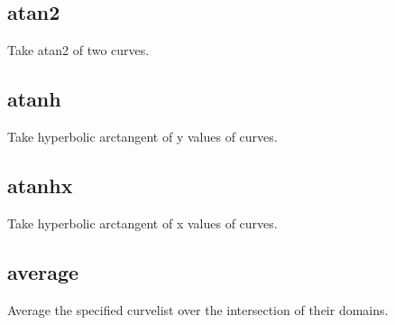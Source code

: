\documentclass[letterpaper,10pt,english]{sphinxmanual}
\begin{document}
\subsection{atan2}
\label{\detokenize{math_operations:atan2}}
Take atan2 of two curves.

\begin{sphinxVerbatim}[commandchars=\\\{\}]
\PYG{p}{[}\PYG{p}{]}   
\end{sphinxVerbatim}


\subsection{atanh}
\label{\detokenize{math_operations:atanh}}
Take hyperbolic arctangent of y values of curves.

\begin{sphinxVerbatim}[commandchars=\\\{\}]
\PYG{p}{[}\PYG{p}{]}  
\end{sphinxVerbatim}


\subsection{atanhx}
\label{\detokenize{math_operations:atanhx}}
Take hyperbolic arctangent of x values of curves.

\begin{sphinxVerbatim}[commandchars=\\\{\}]
\PYG{p}{[}\PYG{p}{]}  
\end{sphinxVerbatim}


\subsection{average}
\label{\detokenize{math_operations:average}}
Average the specified curvelist over the intersection of their domains.

\begin{sphinxVerbatim}[commandchars=\\\{\}]
\PYG{p}{[}\PYG{p}{]}  
\end{sphinxVerbatim}
\end{document}
